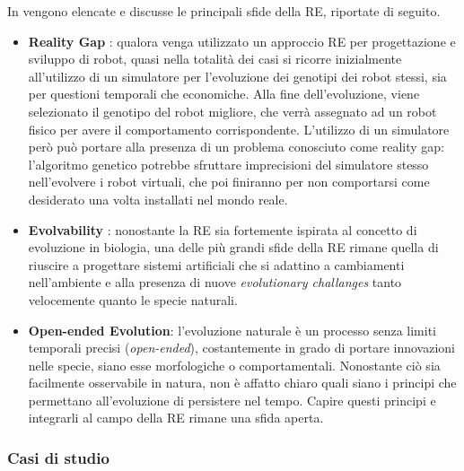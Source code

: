 \documentclass[a4paper,12pt]{article}
\begin{document}
In \cite{ERWWW} vengono elencate e discusse le principali sfide della RE, riportate di seguito.
\begin{itemize}
	\item \textbf{Reality Gap} : qualora venga utilizzato un approccio RE per progettazione e sviluppo di robot, quasi nella totalità dei casi
	si ricorre inizialmente all'utilizzo di un simulatore per l'evoluzione dei genotipi dei robot stessi, sia per questioni temporali che economiche. Alla fine dell'evoluzione, viene selezionato il genotipo del robot migliore, che verrà assegnato ad un robot fisico per avere il comportamento corrispondente. L'utilizzo di un simulatore però può portare alla presenza di un problema conosciuto come reality gap: l'algoritmo genetico potrebbe sfruttare imprecisioni del simulatore stesso nell'evolvere i robot virtuali, che poi finiranno per non comportarsi come desiderato una volta installati nel mondo reale.
	\item \textbf{Evolvability} : nonostante la RE sia fortemente ispirata al concetto di evoluzione in biologia, una delle più grandi sfide della RE rimane quella di riuscire a progettare sistemi artificiali che si adattino a cambiamenti nell'ambiente e alla presenza di nuove \emph{evolutionary challanges} tanto velocemente quanto le specie naturali.
	\item \textbf{Open-ended Evolution}: l'evoluzione naturale è un processo senza limiti temporali precisi (\emph{open-ended}), costantemente in grado di portare innovazioni nelle specie, siano esse morfologiche o comportamentali. Nonostante ciò sia facilmente osservabile in natura, non è affatto chiaro quali siano i principi che permettano all'evoluzione di persistere nel tempo. Capire questi principi e integrarli al campo della RE rimane una sfida aperta.
\end{itemize}

\subsubsection*{Casi di studio}
\end{document}
